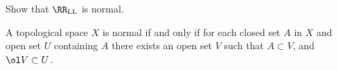 \documentclass{fkpset}
\begin{document}
  \begin{problem}[5.5]
    Show that $\RR_{\rm LL}$ is normal.
  \end{problem}
  \begin{solution}

  \end{solution}
  \clearpage

  \begin{problem}[5.9]
    A topological space $X$ is normal if and only if for each closed
    set $A$ in $X$ and open set $U$ containing $A$ there exists an
    open set $V$ such that $A \subset V$, and $\ol V \subset U$.
  \end{problem}
  \begin{solution}

  \end{solution}
\end{document}
